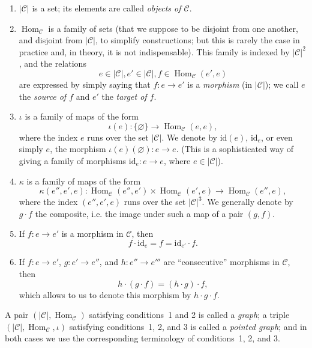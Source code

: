 \documentclass{article}
\newcommand{\oldpage}[1]{\marginpar{\footnotesize$\Big\vert$ \textit{p.~#1}}}
\newcommand{\cat}[1]{\mathcal{#1}}
\newcommand{\id}{\mathrm{id}}
\newcommand{\set}[1]{|#1|}
\DeclareMathOperator{\Hom}{Hom}
\begin{document}
\begin{enumerate}
  \item $\set{\cat{C}}$ is a set; its elements are called \emph{objects of $\cat{C}$}.

  \item $\Hom_\cat{C}$ is a family of sets (that we suppose to be disjoint from one another, and disjoint from $\set{\cat{C}}$, to simplify constructions; but this is rarely the case in practice and, in theory, it is not indispensable).
    This family is indexed by $\set{\cat{C}}^2$, and the relations
    \[
      e\in\set{\cat{C}},
      e'\in\set{\cat{C}},
      f\in\Hom_\cat{C}(e',e)
    \]
    are expressed by simply saying that $f\colon e\to e'$ is a \emph{morphism} (in $\set{\cat{C}}$);
    we call $e$ the \emph{source of $f$} and $e'$ the \emph{target of $f$}.

  \item $\iota$ is a family of maps of the form
    \[
      \iota(e)\colon \{\varnothing\}
      \to \Hom_\cat{C}(e,e),
    \]
    where the index $e$ runs over the set $\set{\cat{C}}$.
    We denote by $\id(e)$, $\id_e$, or even simply $e$, the morphism $\iota(e)(\varnothing)\colon e\to e$.
    \oldpage{220}
    (This is a sophisticated way of giving a family of morphisms $\id_e\colon e\to e$, where $e\in\set{\cat{C}}$).

  \item $\kappa$ is a family of maps of the form
    \[
      \kappa(e'',e',e)\colon
      \Hom_\cat{C}(e'',e')\times\Hom_\cat{C}(e',e)
      \to \Hom_\cat{C}(e'',e),
    \]
    where the index $(e'',e',e)$ runs over the set $\set{\cat{C}}^3$.
    We generally denote by $g\cdot f$ the composite, i.e. the image under such a map of a pair $(g,f)$.

  \item If $f\colon e\to e'$ is a morphism in $\cat{C}$, then
    \[
      f\cdot\id_e
      = f
      = \id_{e'}\cdot f.
    \]

  \item If $f\colon e\to e'$, $g\colon e'\to e''$, and $h\colon e''\to e'''$ are ``consecutive'' morphisms in $\cat{C}$, then
    \[
      h\cdot(g\cdot f)
      = (h\cdot g)\cdot f,
    \]
    which allows to us to denote this morphism by $h\cdot g\cdot f$.
\end{enumerate}

A pair $(\set{\cat{C}},\Hom_\cat{C})$ satisfying conditions~1 and 2 is called a \emph{graph}; a triple $(\set{\cat{C}},\Hom_\cat{C},\iota)$ satisfying conditions~1, 2, and 3 is called a \emph{pointed graph}; and in both cases we use the corresponding terminology of conditions~1, 2, and 3.
\end{document}
